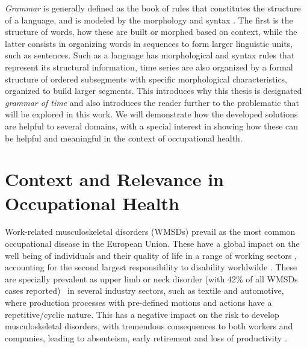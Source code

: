 \textit{Grammar} is generally defined as the book of rules that constitutes the structure of a language, and is modeled by the morphology and syntax \cite{grammar}. The first is the structure of words, how these are built or morphed based on context, while the latter consists in organizing words in sequences to form larger linguistic units, such as sentences. Such as a language has morphological and syntax rules that represent its structural information, time series are also organized by a formal structure of ordered subsegments with specific morphological characteristics, organized to build larger segments.
This introduces why this thesis is designated \textit{grammar of time} and also introduces the reader further to the problematic that will be explored in this work. We will demonstrate how the developed solutions are helpful to several domains, with a special interest in showing how these can be helpful and meaningful in the context of occupational health.

\section{Context and Relevance in Occupational Health} 
\label{sub:context2}

Work-related musculoskeletal disorders (WMSDs) prevail as the most common occupational disease in the European Union. These have a global impact on the well being of individuals and their quality of life in a range of working sectors \cite{Irastorza2010}, accounting for the second largest responsibility to disability worldwilde \cite{Luttmann2003}. These are specially prevalent as upper limb or neck disorder (with 42\% of all WMSDs cases reported)~\cite{Seidel2019} in several industry sectors, such as textile and automotive, where production processes with pre-defined motions and actions have a repetitive/cyclic nature. This has a negative impact on the risk to develop musculoskeletal disorders, with tremendous consequences to both workers and companies, leading to absenteism, early retirement and loss of productivity \cite{Trabalhadores, Varandas19}. 

